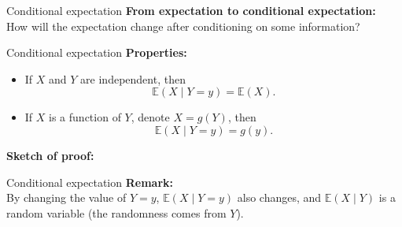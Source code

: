 \documentclass [aspectratio=169]{beamer}
\begin{document}
\begin{frame}{Conditional expectation}
    \textbf{From expectation to conditional expectation:}\\
    How will the expectation change after conditioning on some information? 
    \vspace{0.1in}
\end{frame}


\begin{frame}{Conditional expectation}
    \textbf{Properties:}
    \begin{itemize}
        \item If $X$ and $Y$ are independent, then \\
        $$
        \mathbb{E}(X \mid Y = y) = \mathbb{E}(X).
        $$
        \item If $X$ is a function of $Y$, denote $X = g(Y)$, then 
        $$
        \mathbb{E}(X \mid Y = y) = g(y).
        $$
    \end{itemize}
    \vspace{0.1in}
    \textbf{Sketch of proof:}
    \vspace{1.0in}
\end{frame}

\begin{frame}{Conditional expectation}
\textbf{Remark:}\\
By changing the value of $Y = y$, $\mathbb{E}(X \mid Y = y)$ also changes, and $\mathbb{E}(X \mid Y)$ is a random variable (the randomness comes from $Y$). \\
\vspace{0.1in}
\end{frame}
\end{document}
